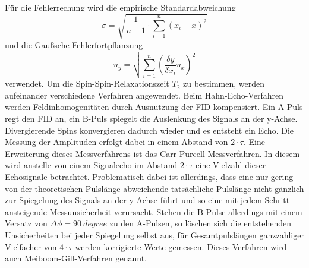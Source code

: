 \noindent Für die Fehlerrechung wird die empirische Standardabweichung
\begin{equation}
  \sigma = \sqrt{\frac{1}{n-1} \cdot \sum_{i=1}^n(x_i-\overline{x})^2}
  \label{eqn:Stdabweichung}
\end{equation}
und die Gaußsche Fehlerfortpflanzung
\begin{equation}
  u_y = \sqrt{\sum_{i=1}^n\left(\frac{\delta y}{\delta x_i}u_x\right)^2}
  \label{eqn:gauß}
\end{equation}
verwendet.
\noindent Um die Spin-Spin-Relaxationszeit $T_2$ zu bestimmen, werden
aufeinander verschiedene Verfahren angewendet. Beim Hahn-Echo-Verfahren werden
Feldinhomogenitäten durch Ausnutzung der FID kompensiert. Ein A-Puls regt den
FID an, ein B-Puls spiegelt die Auslenkung des Signals an der y-Achse.
Divergierende Spins konvergieren dadurch wieder und es entsteht ein Echo. Die
Messung der Amplituden erfolgt dabei in einem Abstand von $2 \cdot \tau$. Eine
Erweiterung dieses Messverfahrens ist das Carr-Purcell-Messverfahren. In diesem
wird anstelle von einem Signalecho im Abstand $2 \cdot \tau$ eine Vielzahl
dieser Echosignale betrachtet. Problematisch dabei ist allerdings, dass eine
nur gering von der theoretischen Pulslänge abweichende tatsächliche
Pulslänge nicht gänzlich zur Spiegelung des Signals an der y-Achse führt und
so eine mit jedem Schritt ansteigende Messunsicherheit verursacht. Stehen die
B-Pulse allerdings mit einem Versatz von $\Delta \phi = \SI{90}{degree}$ zu den
A-Pulsen, so löschen sich die entstehenden Unsicherheiten bei jeder Spiegelung
selbst aus, für Gesamtpulslängen ganzzahliger Vielfacher von $4 \cdot \tau$
werden korrigierte Werte gemessen. Dieses Verfahren wird auch
Meiboom-Gill-Verfahren genannt. \\
